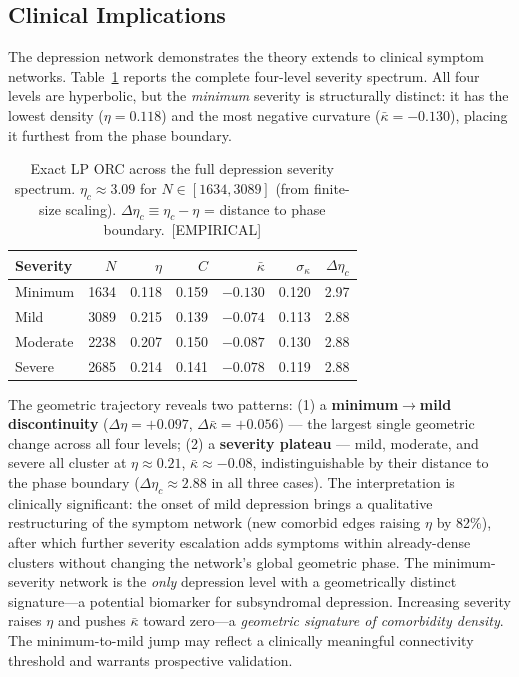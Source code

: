 \documentclass[11pt,a4paper]{article}
\newcommand{\kbar}{\bar{\kappa}}
\begin{document}
\subsection{Clinical Implications}

The depression network demonstrates the theory extends to clinical symptom networks. Table~\ref{tab:depression_severity} reports the complete four-level severity spectrum. All four levels are hyperbolic, but the \emph{minimum} severity is structurally distinct: it has the lowest density ($\eta=0.118$) and the most negative curvature ($\kbar=-0.130$), placing it furthest from the phase boundary.

\begin{table}[h]
\centering
\small
\caption{Exact LP ORC across the full depression severity spectrum. $\eta_c \approx 3.09$ for $N \in [1634, 3089]$ (from finite-size scaling). $\Delta\eta_c \equiv \eta_c - \eta$ = distance to phase boundary.~[EMPIRICAL]}
\label{tab:depression_severity}
\begin{tabular}{@{}lrrrrrr@{}}
\toprule
Severity & $N$ & $\eta$ & $C$ & $\kbar$ & $\sigma_\kappa$ & $\Delta\eta_c$ \\
\midrule
Minimum  & 1634 & 0.118 & 0.159 & $-0.130$ & 0.120 & 2.97 \\
Mild     & 3089 & 0.215 & 0.139 & $-0.074$ & 0.113 & 2.88 \\
Moderate & 2238 & 0.207 & 0.150 & $-0.087$ & 0.130 & 2.88 \\
Severe   & 2685 & 0.214 & 0.141 & $-0.078$ & 0.119 & 2.88 \\
\bottomrule
\end{tabular}
\end{table}

The geometric trajectory reveals two patterns: (1) a \textbf{minimum$\to$mild discontinuity} ($\Delta\eta=+0.097$, $\Delta\kbar=+0.056$) --- the largest single geometric change across all four levels; (2) a \textbf{severity plateau} --- mild, moderate, and severe all cluster at $\eta \approx 0.21$, $\kbar \approx -0.08$, indistinguishable by their distance to the phase boundary ($\Delta\eta_c \approx 2.88$ in all three cases). The interpretation is clinically significant: the onset of mild depression brings a qualitative restructuring of the symptom network (new comorbid edges raising $\eta$ by 82\%), after which further severity escalation adds symptoms within already-dense clusters without changing the network's global geometric phase. The minimum-severity network is the \emph{only} depression level with a geometrically distinct signature---a potential biomarker for subsyndromal depression. Increasing severity raises $\eta$ and pushes $\kbar$ toward zero---a \emph{geometric signature of comorbidity density}. The minimum-to-mild jump may reflect a clinically meaningful connectivity threshold and warrants prospective validation.
\end{document}
